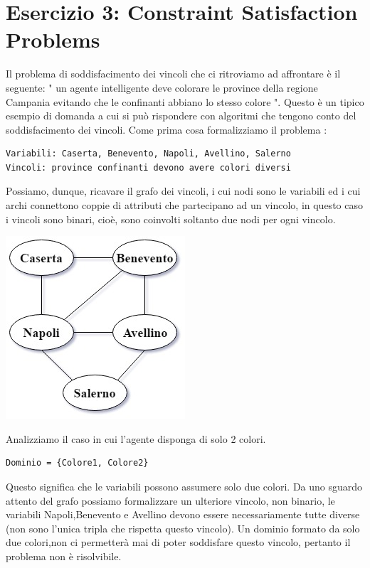 	\section{Esercizio 3: Constraint Satisfaction Problems}
		\label{sec:es3}
		Il problema di soddisfacimento dei vincoli che ci ritroviamo ad affrontare è il seguente: " un agente intelligente  deve colorare le province della regione Campania evitando che le confinanti abbiano lo stesso colore ". Questo è un tipico esempio di domanda a cui si può rispondere con algoritmi che tengono conto del soddisfacimento dei vincoli. Come prima cosa formalizziamo il problema :
		\begin{lstlisting}
Variabili: Caserta, Benevento, Napoli, Avellino, Salerno
Vincoli: province confinanti devono avere colori diversi
		\end{lstlisting}
		Possiamo, dunque, ricavare il grafo dei vincoli, i cui nodi sono le variabili ed i cui archi connettono coppie di attributi che partecipano ad un vincolo, in questo caso i vincoli sono binari, cioè, sono coinvolti soltanto due nodi per ogni vincolo.
		\begin{center}
			\includegraphics[scale=0.7]{ConstraintGraph.jpg}
		\end{center}
		Analizziamo il caso in cui l'agente disponga di solo 2 colori.
		\begin{lstlisting}
Dominio = {Colore1, Colore2}
		\end{lstlisting}
		Questo significa che le variabili possono assumere solo due colori.
		Da uno sguardo attento del grafo possiamo formalizzare un ulteriore vincolo, non binario, le variabili Napoli,Benevento e Avellino devono essere necessariamente tutte diverse (non sono l'unica tripla che rispetta questo vincolo).
		Un dominio formato da solo due colori,non ci permetterà mai di poter soddisfare questo vincolo, pertanto il problema non è risolvibile. 
